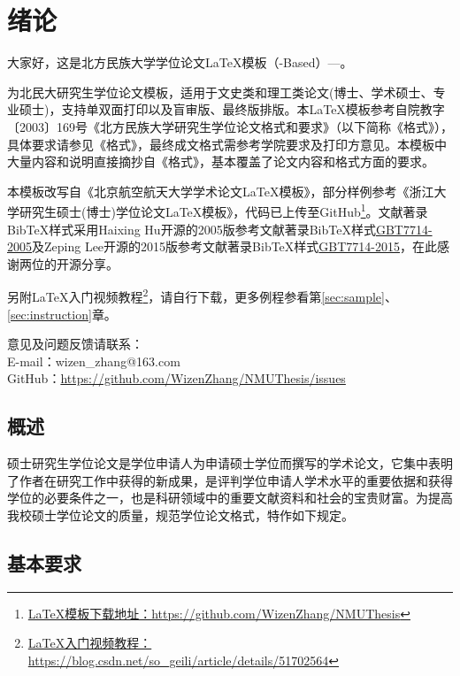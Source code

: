 \chapter{绪论}
大家好，这是北方民族大学学位论文\LaTeX{}模板（\CTeX{}-Based）---\NMUThesis{}。

\NMUThesis{}为北民大研究生学位论文模板，适用于文史类和理工类论文(博士、学术硕士、专业硕士)，支持单双面打印以及盲审版、最终版排版。本\LaTeX{}模板参考自院教字〔2003〕169号《北方民族大学研究生学位论文格式和要求》（以下简称《格式》），具体要求请参见《格式》，最终成文格式需参考学院要求及打印方意见。本模板中大量内容和说明直接摘抄自《格式》，基本覆盖了论文内容和格式方面的要求。

本模板改写自《北京航空航天大学学术论文\LaTeX{}模板》，部分样例参考《浙江大学研究生硕士(博士)学位论文\LaTeX{}模板》，代码已上传至GitHub\footnote{\href{https://github.com/WizenZhang/NMUThesis}{\LaTeX{}模板下载地址：https://github.com/WizenZhang/NMUThesis}}。文献著录BibTeX样式采用Haixing Hu开源的2005版参考文献著录BibTeX样式\href{https://github.com/Haixing-Hu/GBT7714-2005-BibTeX-Style}{GBT7714-2005}及Zeping Lee开源的2015版参考文献著录BibTeX样式\href{https://github.com/zepinglee/gbt7714-bibtex-style}{GBT7714-2015}，在此感谢两位的开源分享。

另附\LaTeX{}入门视频教程\footnote{\href{https://blog.csdn.net/so_geili/article/details/51702564}{\LaTeX{}入门视频教程：https://blog.csdn.net/so\_geili/article/details/51702564}}，请自行下载，更多例程参看第\ref{sec:sample}、\ref{sec:instruction}章。

意见及问题反馈请联系：\\
\indent E-mail：wizen\_zhang@163.com\\
\indent GitHub：\href{https://github.com/WizenZhang/NMUThesis/issues}{https://github.com/WizenZhang/NMUThesis/issues}

\section{概述}
硕士研究生学位论文是学位申请人为申请硕士学位而撰写的学术论文，它集中表明了作者在研究工作中获得的新成果，是评判学位申请人学术水平的重要依据和获得学位的必要条件之一，也是科研领域中的重要文献资料和社会的宝贵财富。为提高我校硕士学位论文的质量，规范学位论文格式，特作如下规定。

\section{基本要求}

